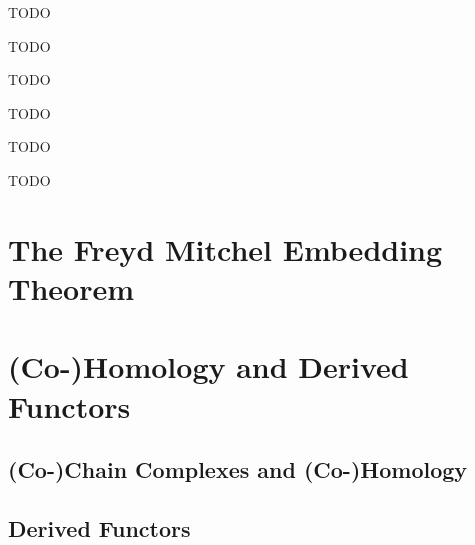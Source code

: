 	\begin{definition}
		TODO
	\end{definition}

	\begin{lemma}
		TODO
	\end{lemma}

	\begin{definition}
		TODO
	\end{definition}

	\begin{lemma}
		TODO
	\end{lemma}

	\begin{definition}
		TODO
	\end{definition}

	\begin{lemma}
		TODO
	\end{lemma}

	\newpage
	\section{The Freyd Mitchel Embedding Theorem}

	\newpage
	\section{(Co-)Homology and Derived Functors}
	\subsection{(Co-)Chain Complexes and (Co-)Homology}
	\subsection{Derived Functors}
